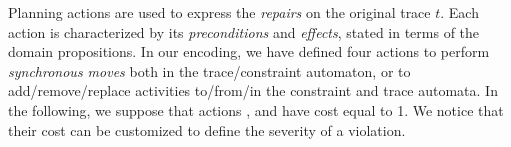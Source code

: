 Planning actions are used to express the \emph{repairs} on the original trace $t$. Each action is characterized by its \emph{preconditions} and \emph{effects}, stated in terms of the domain propositions. In our encoding, we have defined four actions to perform \emph{synchronous moves} both in the trace/constraint automaton, or to add/remove/replace activities to/from/in the constraint and trace automata. In the following, we suppose that actions ,  and  have cost equal to 1. We notice that their cost can be customized to define the severity of a violation.
%

